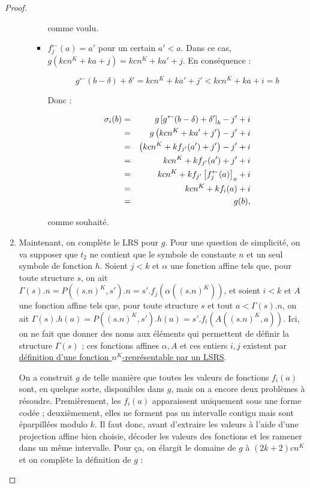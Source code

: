 \begin{appendices}
\begin{proof}
\begin{enumerate}[itemsep=-1mm,leftmargin=2cm]
\begin{itemize}[itemsep=-1mm, leftmargin=1cm]
\begin{itemize}[itemsep=-1mm,leftmargin=1cm]
						comme voulu.
						
						\item
						$f_j^{\leftarrow}(a) = a'$ pour un certain $a' < a$. Dans ce cas, $g\left( kcn^K + ka + j \right) = kcn^K + ka' + j$. En conséquence : 
						
						\begin{equation}
							g^{\leftarrow}\left( b - \delta \right) + \delta' = kcn^K + ka' + j' < kcn^K + ka + i = b
						\end{equation}
						
						Donc :
						
				 
						\begin{eqnarray}
						\sigma_i(b) 	& = &	g\left[ g^{\leftarrow}(b-\delta) +\delta' \right]_{b} - j' + i \\
						& = & 	g\left( kcn^K + ka' + j' \right) - j' + i \\
						& = & 	\left( kcn^K + k f_{j'}(a') + j' \right) - j' + i \\
						& = & 	kcn^K + k f_{j'}(a') + j' + i \\
						& = & 	kcn^K + k f_{j'}\left[ f_j^{\leftarrow}(a) \right]_{a} + i \\
						& = & 	kcn^K + k f_i(a) + i \\
						& = & 	g(b),
						\end{eqnarray}
						
						comme souhaité.
					\end{itemize}
				\end{itemize}
				
				
				\item	
				Maintenant, on complète le LRS pour $g$. Pour une question de simplicité, on va supposer que $t_2$ ne contient que le symbole de constante $n$ et un seul symbole de fonction $h$. Soient $j <k$ et $\alpha$ une fonction affine tels que, pour toute structure $s$, on ait $\Gamma(s).n = P\left((s.n)^K, s'\right).n = s'.f_j\left(\alpha\left( (s.n)^K \right)\right)$, et soient $i <k$ et $A$ une fonction affine tels que, pour toute structure $s$ et tout $a < \Gamma(s).n$, on ait $\Gamma(s).h(a) = P\left((s.n)^K, s'\right).h(a) = s'.f_i\left(A\left( (s.n)^K, a \right)\right)$. Ici, on ne fait que donner des noms aux éléments qui permettent de définir la structure $\Gamma(s)$ ; ces fonctions affines $\alpha, A$ et ces entiers $i,j$ existent par \hyperref[def:representee_par_LSRS]{définition d'une fonction $n^K$-représentable par un LSRS}.
				
				On a construit $g$ de telle manière que toutes les valeurs de fonctions $f_i(a)$ sont, en quelque sorte, disponibles dans $g$, mais on a encore deux problèmes à résoudre. Premièrement, les $f_i(a)$ apparaissent uniquement sous une forme codée ; deuxièmement, elles ne forment pas un intervalle contigu mais sont éparpillées modulo $k$. Il faut donc, avant d'extraire les valeurs à l'aide d'une projection affine bien choisie, décoder les valeurs des fonctions et les ramener dans un même intervalle. Pour ça, on élargit le domaine de $g$ à $(2k+2)cn^K$ et on complète la définition de $g$ :
				

\end{enumerate}
\end{proof}
\end{appendices}
